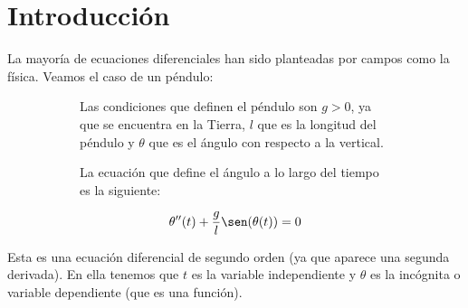 \setcounter{chapter}{-1} %

\chapter{Introducción}

La mayoría de ecuaciones diferenciales han sido planteadas por campos como la física. Veamos el caso de un péndulo:

\begin{figure}[H]
    \centering
    \begin{subfigure}{0.3\textwidth}
        \centering        

        \vspace*{0.5cm}
    \end{subfigure}
    \hfill
    \begin{subfigure}{0.6\textwidth}%
        Las condiciones que definen el péndulo son $g >0$, ya que se encuentra en la Tierra, $l$ que es la longitud del péndulo y $\theta$ que es el ángulo con respecto a la vertical.

        La ecuación que define el ángulo a lo largo del tiempo es la siguiente:

        \begin{gather*}
            \theta''(t) + \frac{g}{l} \sen(\theta(t)) = 0
        \end{gather*}
    \end{subfigure}
    \hfill
\end{figure}

Esta es una ecuación diferencial de segundo orden (ya que aparece una segunda derivada). En ella tenemos que $t$ es la variable independiente y $\theta$ es la incógnita o variable dependiente (que es una función).

